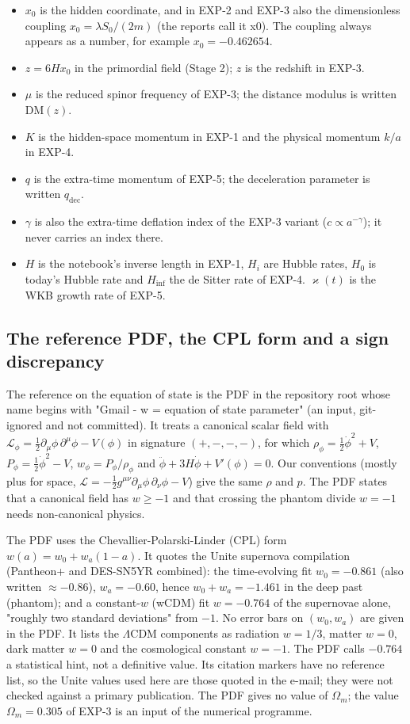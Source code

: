 \documentclass[11pt]{article}
\begin{document}
\begin{itemize}
\item $x_0$ is the hidden coordinate, and in EXP-2 and EXP-3 also the dimensionless coupling $x_0=\lambda S_0/(2m)$ (the reports call it x0). The coupling always appears as a number, for example $x_0=-0.462654$.
\item $z=6Hx_0$ in the primordial field (Stage 2); $z$ is the redshift in EXP-3.
\item $\mu$ is the reduced spinor frequency of EXP-3; the distance modulus is written $\mathrm{DM}(z)$.
\item $K$ is the hidden-space momentum in EXP-1 and the physical momentum $k/a$ in EXP-4.
\item $q$ is the extra-time momentum of EXP-5; the deceleration parameter is written $q_{\mathrm{dec}}$.
\item $\gamma$ is also the extra-time deflation index of the EXP-3 variant ($c\propto a^{-\gamma}$); it never carries an index there.
\item $H$ is the notebook's inverse length in EXP-1, $H_i$ are Hubble rates, $H_0$ is today's Hubble rate and $H_{\mathrm{inf}}$ the de Sitter rate of EXP-4. $\varkappa(t)$ is the WKB growth rate of EXP-5.
\end{itemize}

\subsection{The reference PDF, the CPL form and a sign discrepancy}

The reference on the equation of state is the PDF in the repository root whose name begins with "Gmail - w = equation of state parameter" (an input, git-ignored and not committed). It treats a canonical scalar field with $\mathcal L_\phi=\tfrac12\partial_\mu\phi\,\partial^\mu\phi-V(\phi)$ in signature $(+,-,-,-)$, for which $\rho_\phi=\tfrac12\dot\phi^2+V$, $P_\phi=\tfrac12\dot\phi^2-V$, $w_\phi=P_\phi/\rho_\phi$ and $\ddot\phi+3H\dot\phi+V'(\phi)=0$. Our conventions (mostly plus for space, $\mathcal L=-\tfrac12g^{\mu\nu}\partial_\mu\phi\,\partial_\nu\phi-V$) give the same $\rho$ and $p$. The PDF states that a canonical field has $w\ge-1$ and that crossing the phantom divide $w=-1$ needs non-canonical physics.

The PDF uses the Chevallier-Polarski-Linder (CPL) form $w(a)=w_0+w_a(1-a)$. It quotes the Unite supernova compilation (Pantheon+ and DES-SN5YR combined): the time-evolving fit $w_0=-0.861$ (also written $\approx-0.86$), $w_a=-0.60$, hence $w_0+w_a=-1.461$ in the deep past (phantom); and a constant-$w$ (wCDM) fit $w=-0.764$ of the supernovae alone, "roughly two standard deviations" from $-1$. No error bars on $(w_0,w_a)$ are given in the PDF. It lists the $\Lambda$CDM components as radiation $w=1/3$, matter $w=0$, dark matter $w=0$ and the cosmological constant $w=-1$. The PDF calls $-0.764$ a statistical hint, not a definitive value. Its citation markers have no reference list, so the Unite values used here are those quoted in the e-mail; they were not checked against a primary publication. The PDF gives no value of $\Omega_m$; the value $\Omega_m=0.305$ of EXP-3 is an input of the numerical programme.
\end{document}
